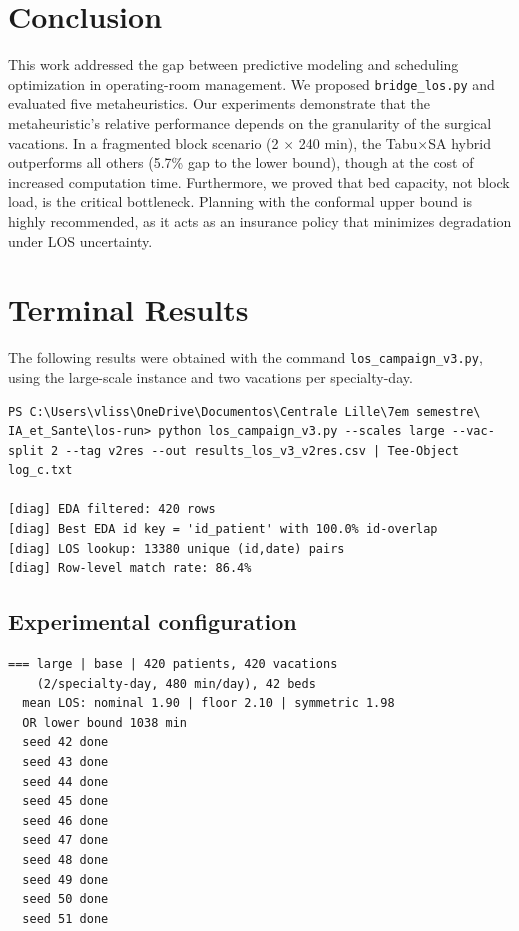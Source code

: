 \documentclass[11pt,a4paper]{article}
\begin{document}
\section{Conclusion}
This work addressed the gap between predictive modeling and scheduling optimization in operating-room management. We proposed \texttt{bridge\_los.py} and evaluated five metaheuristics. Our experiments demonstrate that the metaheuristic's relative performance depends on the granularity of the surgical vacations. In a fragmented block scenario (2 \(\times\) 240 min), the Tabu\(\times\)SA hybrid outperforms all others (5.7\% gap to the lower bound), though at the cost of increased computation time. Furthermore, we proved that bed capacity, not block load, is the critical bottleneck. Planning with the conformal upper bound is highly recommended, as it acts as an insurance policy that minimizes degradation under LOS uncertainty.

\appendix
\section{Terminal Results}
\label{app:terminal-results}

The following results were obtained with the command
\texttt{los\_campaign\_v3.py}, using the large-scale instance and
two vacations per specialty-day.

\begin{verbatim}
PS C:\Users\vliss\OneDrive\Documentos\Centrale Lille\7em semestre\
IA_et_Sante\los-run> python los_campaign_v3.py --scales large --vac-split 2 --tag v2res --out results_los_v3_v2res.csv | Tee-Object log_c.txt

[diag] EDA filtered: 420 rows
[diag] Best EDA id key = 'id_patient' with 100.0% id-overlap
[diag] LOS lookup: 13380 unique (id,date) pairs
[diag] Row-level match rate: 86.4%
\end{verbatim}

\subsection{Experimental configuration}

\begin{verbatim}
=== large | base | 420 patients, 420 vacations
    (2/specialty-day, 480 min/day), 42 beds
  mean LOS: nominal 1.90 | floor 2.10 | symmetric 1.98
  OR lower bound 1038 min
  seed 42 done
  seed 43 done
  seed 44 done
  seed 45 done
  seed 46 done
  seed 47 done
  seed 48 done
  seed 49 done
  seed 50 done
  seed 51 done
\end{verbatim}
\end{document}
